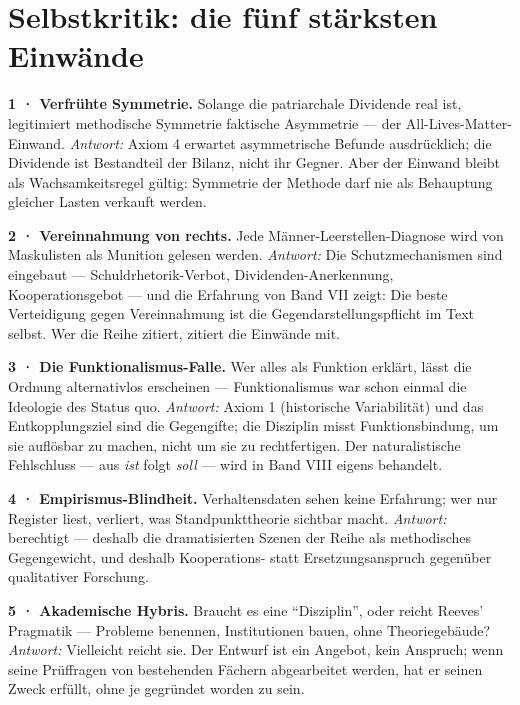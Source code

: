 \section{Selbstkritik: die fünf stärksten Einwände}

\begin{gegen}
\textbf{1 · Verfrühte Symmetrie.} Solange die patriarchale Dividende real ist,
legitimiert methodische Symmetrie faktische Asymmetrie --- der
All-Lives-Matter-Einwand. \emph{Antwort:} Axiom 4 erwartet asymmetrische
Befunde ausdrücklich; die Dividende ist Bestandteil der Bilanz, nicht ihr
Gegner. Aber der Einwand bleibt als Wachsamkeitsregel gültig: Symmetrie der
Methode darf nie als Behauptung gleicher Lasten verkauft werden.

\textbf{2 · Vereinnahmung von rechts.} Jede Männer-Leerstellen-Diagnose wird
von Maskulisten als Munition gelesen werden. \emph{Antwort:} Die
Schutzmechanismen sind eingebaut --- Schuldrhetorik-Verbot, Dividenden-Anerkennung,
Kooperationsgebot --- und die Erfahrung von Band VII zeigt: Die beste
Verteidigung gegen Vereinnahmung ist die Gegendarstellungspflicht im Text
selbst. Wer die Reihe zitiert, zitiert die Einwände mit.

\textbf{3 · Die Funktionalismus-Falle.} Wer alles als Funktion erklärt, lässt
die Ordnung alternativlos erscheinen --- Funktionalismus war schon einmal die
Ideologie des Status quo. \emph{Antwort:} Axiom 1 (historische Variabilität)
und das Entkopplungsziel sind die Gegengifte; die Disziplin misst
Funktionsbindung, um sie auflösbar zu machen, nicht um sie zu rechtfertigen.
Der naturalistische Fehlschluss --- aus \emph{ist} folgt \emph{soll} --- wird
in Band VIII eigens behandelt.

\textbf{4 · Empirismus-Blindheit.} Verhaltensdaten sehen keine Erfahrung; wer
nur Register liest, verliert, was Standpunkttheorie sichtbar macht.
\emph{Antwort:} berechtigt --- deshalb die dramatisierten Szenen der Reihe als
methodisches Gegengewicht, und deshalb Kooperations- statt
Ersetzungsanspruch gegenüber qualitativer Forschung.

\textbf{5 · Akademische Hybris.} Braucht es eine \enquote{Disziplin}, oder
reicht Reeves' Pragmatik --- Probleme benennen, Institutionen bauen, ohne
Theoriegebäude? \emph{Antwort:} Vielleicht reicht sie. Der Entwurf ist ein
Angebot, kein Anspruch; wenn seine Prüffragen von bestehenden Fächern
abgearbeitet werden, hat er seinen Zweck erfüllt, ohne je gegründet worden zu
sein.
\end{gegen}

